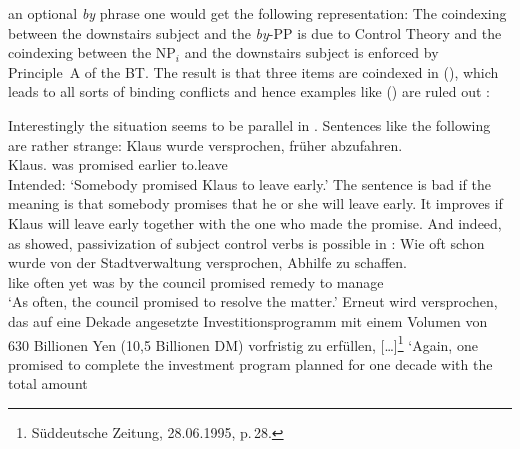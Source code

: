 \documentclass[output=paper
	        ,collection
	        ,collectionchapter
 	        ,biblatex
                ,babelshorthands
                ,newtxmath
                ,draftmode
                ,colorlinks, citecolor=brown
]{langscibook}
\begin{document}
an optional \emph{by} phrase one would get the following representation:
\ea
{}
\z
The coindexing between the downstairs subject and the \emph{by}-PP is due to Control Theory and the
coindexing between the NP$_i$ and the downstairs subject is enforced by Principle~A of the BT. The
result is that three items are coindexed in (), which leads to all sorts of binding conflicts
and hence examples like () are ruled out \citep[]{ps2}:
\eal
{}
\zl

Interestingly the situation seems to be parallel in . Sentences like the following are rather
strange:
\ea
\gll Klaus        wurde versprochen, früher abzufahren.\\
     Klaus.\dat{} was   promised     earlier to.leave\\
\glt Intended: `Somebody promised Klaus to leave early.'
\z 
The sentence is bad if the meaning is that somebody promises that he or she will leave early. It
improves if Klaus will leave early together with the one who made the promise. And indeed, as \citet[]{Mueller2002b}
showed, passivization of subject control verbs is possible in :
\eal
\ex 
\gll Wie oft schon wurde von der Stadtverwaltung versprochen, Abhilfe zu schaffen.\footnotemark\\
     like often yet was  by the council          promised     remedy  to manage\\
\glt `As often, the council promised to resolve the matter.'
\ex Erneut wird versprochen, das auf eine Dekade angesetzte Investitionsprogramm mit einem Volumen von 630 Billionen Yen (10,5
Billionen DM) vorfristig zu erfüllen, [\ldots]\footnote{
    Süddeutsche Zeitung, 28.06.1995, p.\,28.%
}
\glt `Again, one promised to complete the investment program planned for one decade with the total amount 
\end{document}
